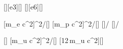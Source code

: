 [\kilo\electronvolt][e3][\electronvolt]
[\mega\electronvolt][e6][\electronvolt]

[m_e c^2]{\ncmeX*\nccX^2/\nceX}[\electronvolt]
[m_p c^2]{\ncmpX*\nccX^2/\nceX}[\electronvolt]
[]{\EeX/\EzeX}
[]{\EpX/\EzpX}

[\atomicmassunit]
[m_u c^2]{\ncuX*\nccX^2/\nceX}[\electronvolt]
[12\,m_u c^2]{\mCX*\EuX}[\electronvolt]
